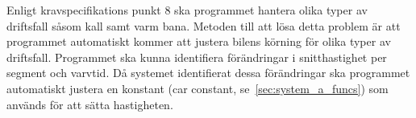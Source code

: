 Enligt kravspecifikations punkt 8 ska programmet hantera olika typer av
driftsfall såsom kall samt varm bana.  Metoden till att lösa detta problem är
att programmet automatiskt kommer att justera bilens körning för olika typer av
driftsfall. Programmet ska kunna identifiera förändringar i snitthastighet per
segment och varvtid. Då systemet identifierat dessa förändringar ska programmet
automatiskt justera en konstant (car constant, se~\ref{sec:system_a_funcs}) som
används för att sätta hastigheten.
